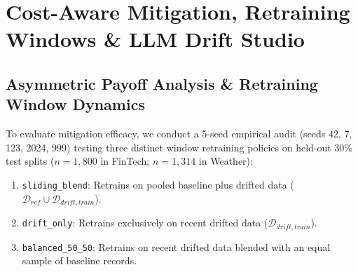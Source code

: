 \documentclass[conference]{IEEEtran}
\begin{document}
\section{Cost-Aware Mitigation, Retraining Windows \& LLM Drift Studio}

\subsection{Asymmetric Payoff Analysis \& Retraining Window Dynamics}
To evaluate mitigation efficacy, we conduct a 5-seed empirical audit (seeds 42, 7, 123, 2024, 999) testing three distinct window retraining policies on held-out 30\% test splits ($n=1{,}800$ in FinTech; $n=1{,}314$ in Weather):
\begin{enumerate}
    \item \texttt{sliding\_blend}: Retrains on pooled baseline plus drifted data ($\mathcal{D}_{ref} \cup \mathcal{D}_{drift, train}$).
    \item \texttt{drift\_only}: Retrains exclusively on recent drifted data ($\mathcal{D}_{drift, train}$).
    \item \texttt{balanced\_50\_50}: Retrains on recent drifted data blended with an equal sample of baseline records.
\end{enumerate}
\end{document}
